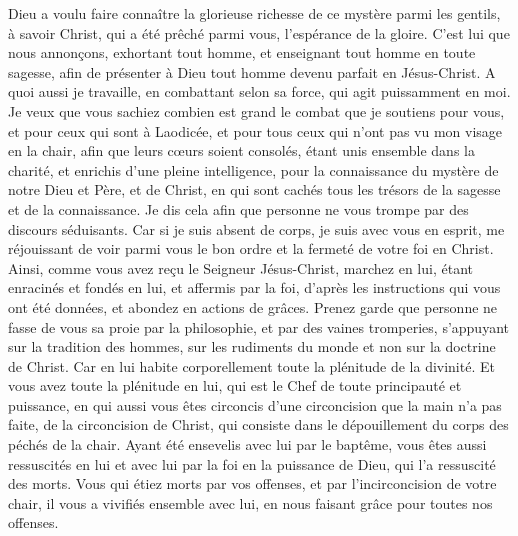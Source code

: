 \begin{multicols}{2}
Dieu a voulu faire connaître la glorieuse richesse de ce mystère parmi les gentils, à savoir Christ, qui a été prêché parmi vous, l'espérance de la gloire.
C’est lui que nous annonçons, exhortant tout homme, et enseignant tout homme en toute sagesse, afin de présenter à Dieu tout homme devenu parfait en Jésus-Christ.
A quoi aussi je travaille, en combattant selon sa force, qui agit puissamment en moi.
\VerseOne{}Je veux que vous sachiez combien est grand le combat que je soutiens pour vous, et pour ceux qui sont à Laodicée, et pour tous ceux qui n'ont pas vu mon visage en la chair,
afin que leurs cœurs soient consolés, étant unis ensemble dans la charité, et enrichis d'une pleine intelligence, pour la connaissance du mystère de notre Dieu et Père, et de Christ,
en qui sont cachés tous les trésors de la sagesse et de la connaissance.
Je dis cela afin que personne ne vous trompe par des discours séduisants.
Car si je suis absent de corps, je suis avec vous en esprit, me réjouissant de voir parmi vous le bon ordre et la fermeté de votre foi en Christ.
Ainsi, comme vous avez reçu le Seigneur Jésus-Christ, marchez en lui,
étant enracinés et fondés en lui, et affermis par la foi, d’après les instructions qui vous ont été données, et abondez en actions de grâces.
Prenez garde que personne ne fasse de vous sa proie par la philosophie, et par des vaines tromperies, s’appuyant sur la tradition des hommes, sur les rudiments du monde et non sur la doctrine de Christ.
Car en lui habite corporellement toute la plénitude de la divinité.
Et vous avez toute la plénitude en lui, qui est le Chef de toute principauté et puissance,
en qui aussi vous êtes circoncis d'une circoncision que la main n’a pas faite, de la circoncision de Christ, qui consiste dans le dépouillement du corps des péchés de la chair.
Ayant été ensevelis avec lui par le baptême, vous êtes aussi ressuscités en lui et avec lui par la foi en la puissance de Dieu, qui l'a ressuscité des morts.
Vous qui étiez morts par vos offenses, et par l’incirconcision de votre chair, il vous a vivifiés ensemble avec lui, en nous faisant grâce pour toutes nos offenses.

\end{multicols}
